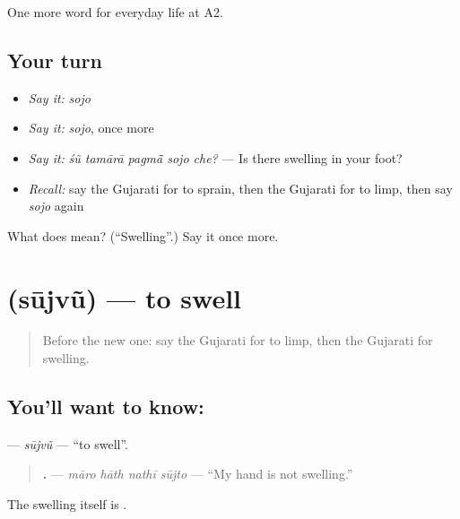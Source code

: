 \begin{grammarlens}[title={What you've built}]
One more word for everyday life at A2.
\end{grammarlens}

\subsection*{Your turn}
\begin{itemize}
\raggedright
  \item \emph{Say it:} \emph{sojo}
  \item \emph{Say it:} \emph{sojo}, once more
  \item \emph{Say it:} \emph{śũ tamārā pagmā̃ sojo che?} — Is there swelling in your foot?
  \item \emph{Recall:} say the Gujarati for to sprain, then the Gujarati for to limp, then say \emph{sojo} again
\end{itemize}

\begin{tcolorbox}[breakable,colback=teal!4,colframe=teal!35!black,title={Before you move on}]
What does  mean? (\textquotedblleft{}Swelling\textquotedblright{}.) Say it once more.
\end{tcolorbox}
\section[\texorpdfstring{\gu{સૂજવું} (sūjvũ)}{સૂજવું (sūjvũ)}]{ (sūjvũ) — to swell}

\label{lesson:GU-C228-sujvu}



\begin{quote}
Before the new one: say the Gujarati for to limp, then the Gujarati for swelling.
\end{quote}

\subsection*{You'll want to know: }
\textbf{} — \emph{sūjvũ} — \textquotedblleft{}to swell\textquotedblright{}.

\begin{quote}
\textbf{   .} — \emph{māro hāth nathī sūjto} — \textquotedblleft{}My hand is not swelling.\textquotedblright{}
\end{quote}

The swelling itself is \textbf{}.

